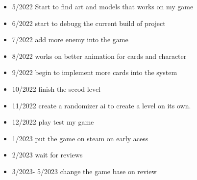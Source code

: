 \documentclass[10pt,twocolumn]{article}
\begin{document}
\begin{itemize}
\item 5/2022 Start to find art and models that works on my game
\item 6/2022 start to debugg the current build of project
\item 7/2022 add more enemy into the game
\item 8/2022 works on better animation for cards and character
\item 9/2022 begin to implement more cards into the system
\item 10/2022 finish the secod level
\item 11/2022 create a randomizer ai to create a level on its own.
\item 12/2022 play test my game
\item 1/2023 put the game on steam on early acess
\item 2/2023 wait for reviews
\item 3/2023- 5/2023 change the game base on review

\end {itemize}
\printbibliography
\end{document}
